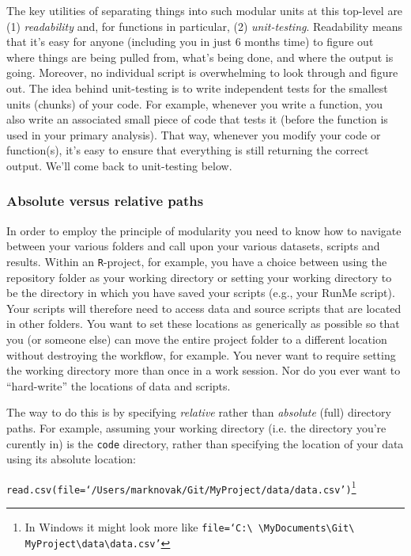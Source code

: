 \documentclass[12pt,letterpaper]{article}
\begin{document}
The key utilities of separating things into such modular units at this top-level are (1) \emph{readability} and, for functions in particular,
(2) \emph{unit-testing}.
Readability means that it's easy for anyone (including you in just 6 months time) to figure out where things are being pulled from, what's being done, and where the output is going. Moreover, no individual script is overwhelming to look through and figure out.
The idea behind unit-testing is to write independent tests for the smallest units (chunks) of your code.
For example, whenever you write a function, you also write an associated small piece of code that tests it (before the function is used in your primary analysis).
That way, whenever you modify your code or function(s), it's easy to ensure that everything is still returning the correct output.
We'll come back to unit-testing below.


\subsubsection{Absolute versus relative paths}
In order to employ the principle of modularity you need to know how to navigate between your various folders and call upon your various datasets, scripts and results.
Within an \texttt{R}-project, for example, you have a choice between using the repository folder as your working directory or setting your working directory to be the directory in which you have saved your scripts (e.g., your RunMe script).
Your scripts will therefore need to access data and source scripts that are located in other folders.
You want to set these locations as generically as possible so that you (or someone else) can move the entire project folder to a different location without destroying the workflow, for example.
You never want to require setting the working directory more than once in a work session.
Nor do you ever want to ``hard-write'' the locations of data and scripts.

The way to do this is by specifying \emph{relative} rather than \emph{absolute} (full) directory paths.
For example, assuming your working directory (i.e. the directory you're curently in) is the \texttt{code} directory, rather than specifying the location of your data using its absolute location:

\texttt{read.csv(file=`/Users/marknovak/Git/MyProject/data/data.csv')}\footnote{In
 Windows it might look more like \texttt{file=`C:\textbackslash 
\textbackslash MyDocuments\textbackslash Git\textbackslash 
MyProject\textbackslash data\textbackslash data.csv'}}
\end{document}
